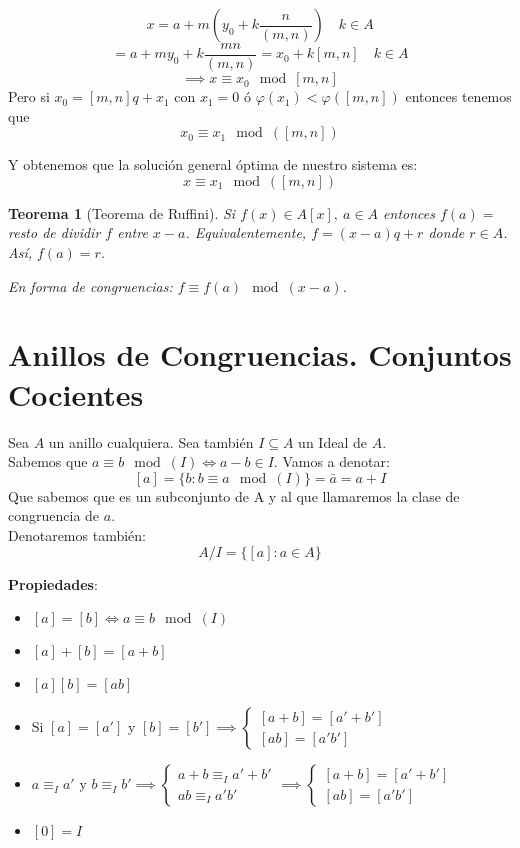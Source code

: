 \documentclass[11pt, a4paper, titlepage]{article}
\makeatletter
\renewenvironment{proof}[1][\proofname] {\vspace{-15pt}\par\pushQED{\qed}\normalfont\topsep6\p@\@plus6\p@\relax\trivlist\item[\hskip\labelsep\it#1\@addpunct{.}]\ignorespaces}{\popQED\endtrivlist\@endpefalse}
\theoremstyle{theorem-style}
\newtheorem*{nth}{Teorema}
\theoremstyle{definition-style}
\theoremstyle{remark-style}
\theoremstyle{example-style}
\makeatother
\begin{document}
\[
x = a +m(y_0 +  k\frac{n}{(m,n)}) \quad k \in A
\]
\[
 = a+my_0 + k \frac{mn}{(m,n)} = x_0 +k[m,n] \quad k \in A
\]
\[
\implies x \equiv x_0 \mod [m,n]
\]
Pero si $x_0 = [m,n]q + x_1$ con $x_1 = 0 $ ó $\varphi(x_1) < \varphi([m,n])$ entonces tenemos que $$x_0 \equiv x_1 \mod([m,n])$$

Y obtenemos que la solución general óptima de nuestro sistema es:
\[
x \equiv x_1 \mod([m,n])
\]


\begin{nth}[Teorema de Ruffini]
	Si $f(x) \in A[x], \ a \in A$ entonces $f(a) =$ resto de dividir $f$ entre $x-a$.
	Equivalentemente, $f = (x-a)q+r$ donde $r\in A$. Así, $f(a) = r$.
	
	En forma de congruencias: $f \equiv f(a)\mod(x-a)$.
\end{nth}
\section{Anillos de Congruencias. Conjuntos Cocientes}

Sea $A$ un anillo cualquiera. Sea también $I \subseteq A$ un Ideal de $A$.\\
Sabemos que $a \equiv b \mod(I) \iff a-b \in I$. Vamos a denotar:
\[
[a] = \{ b: b\equiv a \mod(I)\} = \bar{a} = a + I
\]
Que sabemos que es un subconjunto de A y al que llamaremos la clase de congruencia de $a$.\\
Denotaremos también:
\[
 A/I = \{[a]: a \in A\}
\]


\textbf{Propiedades}:\\
\begin{itemize}
	\item $  [a]=[b] \iff a \equiv b \mod (I) $
	\item $[a] + [b] = [a+b]$
	\item $[a][b] = [ab] $
	\item Si $[a] = [a']$ y $[b] = [b'] \implies \begin{cases}
	[a+b] = [a' +b']\\
	[ab] = [a'b']
\end{cases}$\\

\begin{proof}
	$a\equiv_I a'$ y $b \equiv_I b' \implies \begin{cases}
	a+b \equiv_I a'+b'\\
	ab \equiv_I a'b'
\end{cases}\implies \begin{cases}
	[a+b] = [a'+b']\\
	[ab] = [a'b']
\end{cases}$
\end{proof}
	\item $[0] = I$
\end{itemize}
\end{document}
